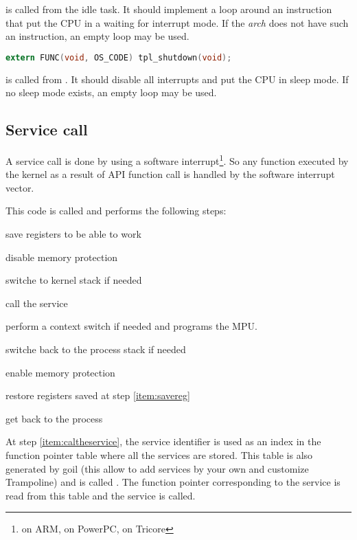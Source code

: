  is called from the idle task. It should implement a loop around an instruction that put the CPU in a waiting for interrupt mode. If the {\em arch} does not have such an instruction, an empty loop may be used.


\begin{lstlisting}[language=C]
extern FUNC(void, OS_CODE) tpl_shutdown(void);
\end{lstlisting}

 is called from . It should disable all interrupts and put the CPU in sleep mode. If no sleep mode exists, an empty loop may be used.


\subsection{Service call}

A service call is done by using a software interrupt\footnote{ on ARM,  on PowerPC,  on Tricore}. So any function executed by the kernel as a result of API function call is handled by the software interrupt vector.

This code is called  and performs the following steps:

\begin{penum}
\item save registers to be able to work \label{item:savereg}
\item disable memory protection
\item switche to kernel stack if needed
\item call the service \label{item:caltheservice}
\item perform a context switch if needed and programs the MPU.
\item switche back to the process stack if needed
\item enable memory protection
\item restore registers saved at step \ref{item:savereg}
\item get back to the process
\end{penum}

At step \ref{item:caltheservice}, the service identifier is used as an index in the function pointer table where all the services are stored. This table is also generated by goil (this allow to add services by your own and customize Trampoline) and is called . The function pointer corresponding to the service is read from this table and the service is called.

